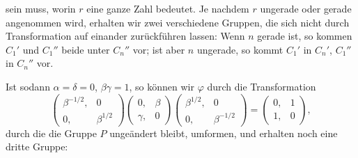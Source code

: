 
sein muss, worin $r$ eine ganze Zahl bedeutet. Je nachdem $r$ ungerade oder gerade angenommen wird, erhalten wir zwei verschiedene Gruppen, die sich nicht durch Transformation auf einander zur\"uckf\"uhren lassen:
Wenn $n$ gerade ist, so kommen $C_1'$ und $C_1''$ beide unter $C_n''$ vor; ist aber $n$ ungerade, so kommt $C_1'$ in $C_n'$, $C_1''$ in $C_n''$ vor.

Ist sodann $\alpha = \delta = 0$, $\beta\gamma = 1$, so k\"onnen wir $\varphi$ durch die Transformation
\[
\begin{pmatrix} \beta^{-1/2}, & 0 \\ 0, & \beta^{1/2} \end{pmatrix}
\begin{pmatrix} 0, & \beta \\ \gamma, & 0 \end{pmatrix}
\begin{pmatrix} \beta^{1/2}, & 0 \\ 0, & \beta^{-1/2} \end{pmatrix}
= \begin{pmatrix} 0, & 1 \\ 1, & 0 \end{pmatrix},
\]
durch die die Gruppe $P$ unge\"andert bleibt, umformen, und erhalten noch eine dritte Gruppe:

